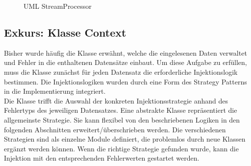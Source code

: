 \begin{figure}[!htb] 
\centering
	\caption{UML StreamProcessor}
 	\label{FileProcessorUML}
\end{figure}

\subsection*{Exkurs: Klasse Context}

Bisher wurde häufig die Klasse  erwähnt, welche die eingelesenen Daten verwaltet und  Fehler in die enthaltenen Datensätze einbaut. Um diese Aufgabe zu erfüllen, muss die Klasse  zunächst für jeden Datensatz die erforderliche Injektionslogik bestimmen. Die Injektionslogiken wurden durch eine Form des Strategy Patterns \cite{GammaEtAl00} in die Implementierung integriert.\\
Die Klasse  trifft die Auswahl der konkreten Injektionsstrategie anhand des Fehlertyps des jeweiligen Datensatzes. Eine abstrakte Klasse repräsentiert die allgemeinste Strategie. Sie kann flexibel von den beschriebenen Logiken in den folgenden Abschnitten erweitert/überschrieben werden. Die verschiedenen Strategien sind als einzelne Module definiert, die problemlos durch neue Klassen erg\"anzt werden können. Wenn die richtige Strategie gefunden wurde, kann die Injektion mit den entsprechenden Fehlerwerten gestartet werden.